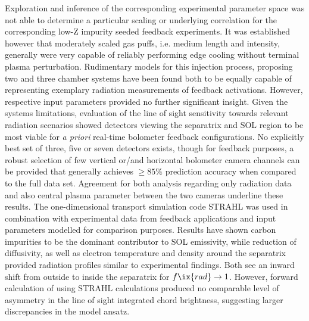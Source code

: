     Exploration and inference of the corresponding experimental parameter space was not able to determine a particular scaling or underlying correlation for the corresponding low-Z impurity seeded feedback experiments. It was established however that moderately scaled gas puffs, i.e. medium length and intensity, generally were very capable of reliably performing edge cooling without terminal plasma perturbation. Rudimentary models for this injection process, proposing two and three chamber systems have been found both to be equally capable of representing exemplary radiation measurements of feedback activations. However, respective input parameters provided no further significant insight. Given the systems limitations, evaluation of the line of sight sensitivity towards relevant radiation scenarios showed detectors viewing the separatrix and SOL region to be most viable for \textit{a priori} real-time bolometer feedback configurations. No explicitly best set of three, five or seven detectors exists, though for feedback purposes, a robust selection of few vertical or/and horizontal bolometer camera channels can be provided that generally achieves $\ge85\%$ prediction accuracy when compared to the full data set. Agreement for both analysis regarding only radiation data and also central plasma parameter between the two cameras underline these results. The one-dimensional transport simulation code STRAHL was used in combination with experimental data from feedback applications and input parameters modelled for comparison purposes. Results have shown carbon impurities to be the dominant contributor to SOL emissivity, while reduction of diffusivity, as well as electron temperature and density around the separatrix provided radiation profiles similar to experimental findings. Both see an inward shift from outside to inside the separatrix for $f\ix{rad}\rightarrow1$. However, forward calculation of using STRAHL calculations produced no comparable level of asymmetry in the line of sight integrated chord brightness, suggesting larger discrepancies in the model ansatz.\\%
%
    \,\newline%
